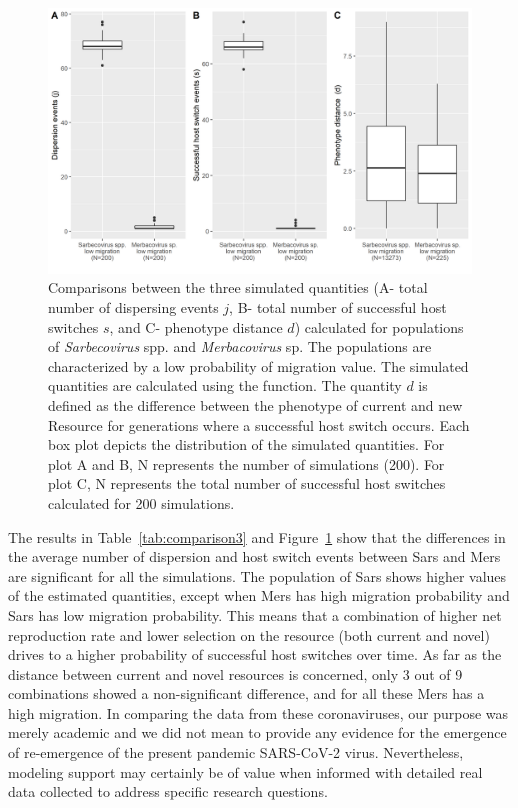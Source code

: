 \begin{figure}[htbp]
  \centering
  \includegraphics[width=120mm,scale=0.7]{figure 3usage.png}
  \caption{Comparisons between the three simulated quantities (A- total number of dispersing events $j$, B- total number of successful host switches $s$, and C- phenotype distance $d$) calculated for populations of \textit{Sarbecovirus} spp. and \textit{Merbacovirus} sp. The populations are characterized by a low probability of migration value. The simulated quantities are calculated using the  function. The quantity $d$ is defined as the difference between the phenotype of current and new Resource for generations where a successful host switch occurs. Each box plot depicts the distribution of the simulated quantities. For plot A and B, N represents the number of simulations (200). For plot C, N represents the total number of successful host switches calculated for 200 simulations.}
  \label{figure:Boxplots3}
\end{figure}

The results in Table~\ref{tab:comparison3} and Figure~\ref{figure:Boxplots3} show that the differences in the average number of dispersion and host switch events between Sars and Mers are significant for all the simulations. The population of Sars shows higher values of the estimated quantities, except when Mers has high migration probability and Sars has low migration probability. 
This means that a combination of higher net reproduction rate and lower selection on the resource (both current and novel) drives to a higher probability of successful host switches over time.
As far as the distance between current and novel resources is concerned, only 3 out of 9 combinations showed a non-significant difference, and for all these Mers has a high migration.
In comparing the data from these coronaviruses, our purpose was merely academic and we did not mean to provide any evidence for the emergence of re-emergence of the present pandemic SARS-CoV-2 virus. Nevertheless, modeling support may certainly be of value when informed with detailed real data collected to address specific research questions.

